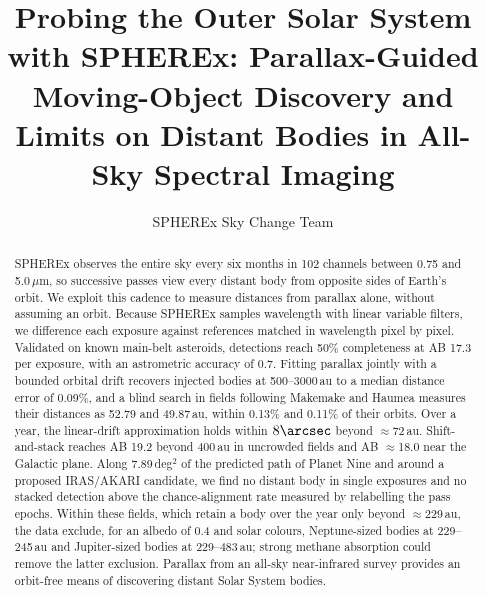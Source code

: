 \documentclass[twocolumn,linenumbers]{aastex702}
\begin{document}
\title{Probing the Outer Solar System with SPHEREx: Parallax-Guided Moving-Object Discovery and Limits on Distant Bodies in All-Sky Spectral Imaging}

\author{SPHEREx Sky Change Team}

\begin{abstract}
SPHEREx observes the entire sky every six months in 102 channels between 0.75 and 5.0\,$\mu$m, so successive passes view every distant body from opposite sides of Earth's orbit. We exploit this cadence to measure distances from parallax alone, without assuming an orbit. Because SPHEREx samples wavelength with linear variable filters, we difference each exposure against references matched in wavelength pixel by pixel. Validated on known main-belt asteroids, detections reach 50\% completeness at AB 17.3 per exposure, with an astrometric accuracy of 0.7\arcsec. Fitting parallax jointly with a bounded orbital drift recovers injected bodies at 500--3000\,au to a median distance error of 0.09\%, and a blind search in fields following Makemake and Haumea measures their distances as 52.79 and 49.87\,au, within 0.13\% and 0.11\% of their orbits. Over a year, the linear-drift approximation holds within $8\arcsec$ beyond $\approx$72\,au. Shift-and-stack reaches AB 19.2 beyond 400\,au in uncrowded fields and AB $\approx$18.0 near the Galactic plane. Along 7.89\,deg$^2$ of the predicted path of Planet Nine and around a proposed IRAS/AKARI candidate, we find no distant body in single exposures and no stacked detection above the chance-alignment rate measured by relabelling the pass epochs. Within these fields, which retain a body over the year only beyond $\approx$229\,au, the data exclude, for an albedo of 0.4 and solar colours, Neptune-sized bodies at 229--245\,au and Jupiter-sized bodies at 229--483\,au; strong methane absorption could remove the latter exclusion. Parallax from an all-sky near-infrared survey provides an orbit-free means of discovering distant Solar System bodies.
\end{abstract}

\end{document}
